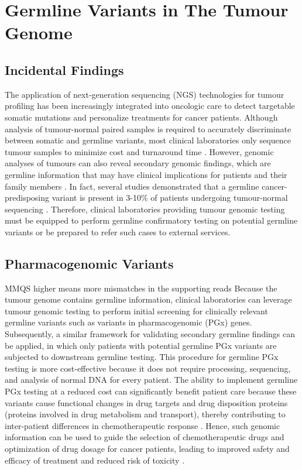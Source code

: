 \section{Germline Variants in The Tumour Genome}
\label{sec:GermlineVariantCallinginTheTumourGenome}

\subsection{Incidental Findings}
The application of next-generation sequencing (NGS) technologies for tumour profiling has been increasingly integrated into oncologic care to detect targetable somatic mutations and personalize treatments for cancer patients. Although analysis of tumour-normal paired samples is required to accurately discriminate between somatic and germline variants, most clinical laboratories only sequence tumour samples to minimize cost and turnaround time \cite{Raymond2016}. However, genomic analyses of tumours can also reveal secondary genomic findings, which are germline information that may have clinical implications for patients and their family members \cite{Raymond2016}. In fact, several studies demonstrated that a germline cancer-predisposing variant is present in 3-10\% of patients undergoing tumour-normal sequencing \cite{Raymond2016,Meric-Bernstam2016,Schrader2015,Jones2015}. Therefore, clinical laboratories providing tumour genomic testing must be equipped to perform germline confirmatory testing on potential germline variants or be prepared to refer such cases to external services.

\subsection{Pharmacogenomic Variants}
MMQS higher means more mismatches in the supporting reads
Because the tumour genome contains germline information, clinical laboratories can leverage tumour genomic testing to perform initial screening for clinically relevant germline variants such as variants in pharmacogenomic (PGx) genes. Subsequently, a similar framework for validating secondary germline findings can be applied, in which only patients with potential germline PGx variants are subjected to downstream germline testing. This procedure for germline PGx testing is more cost-effective because it does not require processing, sequencing, and analysis of normal DNA for every patient. The ability to implement germline PGx testing at a reduced cost can significantly benefit patient care because these variants cause functional changes in drug targets and drug disposition proteins (proteins involved in drug metabolism and transport), thereby contributing to inter-patient differences in chemotherapeutic response \cite{McLeod2013}. Hence, such genomic information can be used to guide the selection of chemotherapeutic drugs and optimization of drug dosage for cancer patients, leading to improved safety and efficacy of treatment and reduced risk of toxicity \cite{McLeod2013}.

